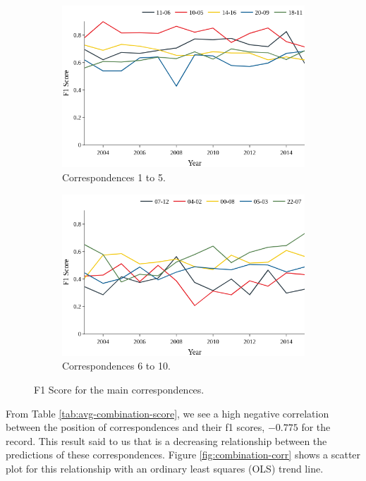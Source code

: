 \begin{figure}[h!]
	\begin{subfigure}{0.49\textwidth}
		\includegraphics[width=\linewidth]{01.Chapters/05.Results/f1-combination-1-5}
		\caption{Correspondences 1 to 5.}
		\label{fig:top1-5}
	\end{subfigure}%
	\hfill
	\begin{subfigure}{0.49\textwidth}
		\includegraphics[width=\linewidth]{01.Chapters/05.Results/f1-combination-6-10}
		\caption{Correspondences 6 to 10.}
		\label{fig:top6-10}
	\end{subfigure}%
	\caption{F1 Score for the main correspondences.}
	\label{fig:f1-combination}
\end{figure}


From Table \ref{tab:avg-combination-score}, we see a high negative correlation between the position of correspondences and their f1 scores, $-0.775$ for the record. This result said to us that is a decreasing relationship between the predictions of these correspondences. Figure \ref{fig:combination-corr} shows a scatter plot for this relationship with an ordinary least squares (OLS) trend line.

